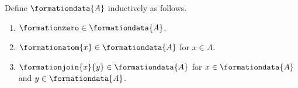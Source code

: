 \begin{datatype}\label{formation_data}
    Define $\formationdata{A}$ inductively as follows.
    \begin{enumerate}
        \item[Falsity] $\formationzero\in\formationdata{A}$.
        \item[Atom] $\formationatom{x}\in\formationdata{A}$ for $x\in A$.
        \item[Implication] $\formationjoin{x}{y}\in\formationdata{A}$ for
            $x\in\formationdata{A}$ and $y\in\formationdata{A}$.
    \end{enumerate}
\end{datatype}

